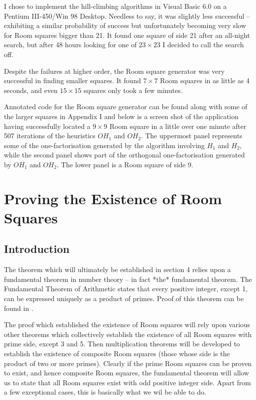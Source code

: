 \documentclass[11pt, a4paper]{book}\usepackage[]{graphicx}\usepackage[]{xcolor}
\begin{document}
I chose to implement the hill-climbing algorithms in Visual Basic
6.0 on a Pentium III-450/Win 98 Desktop. Needless to say, it was
slightly less successful – exhibiting a similar probability of
success but unfortunately becoming very slow for Room squares
bigger than 21. It found one square of side 21 after an all-night
search, but after 48 hours looking for one of
$23 \times 23$
I decided to
call the search off.

Despite the failures at higher order, the Room square generator
was very successful in finding smaller squares. It found
$7 \times 7$
Room squares in as little as 4 seconds, and even
$15 \times 15$
squares only took a few minutes.

Annotated code for the Room square generator can be found along
with some of the larger squares in Appendix I and below is a
screen shot of the application having successfully located a 
$9 \times 9$
Room square in a little over one minute after 507 iterations of
the heuristics $OH_1$ and $OH_2$. The uppermost panel represents
some of the one-factorisation generated by the algorithm involving
$H_1$ and $H_2$, while the second panel shows part of the
orthogonal one-factorisation generated by $OH_1$ and $OH_2$. The
lower panel is a Room square of side 9.


\chapter{Proving the Existence of Room Squares}

\section{Introduction}

The theorem which will ultimately be established in section
4 relies upon a fundamental theorem in number theory – in
fact *the* fundamental theorem. The Fundamental Theorem of
Arithmetic states that every positive integer, except 1, can
be expressed uniquely as a product of primes. Proof of this
theorem can be found in
\cite{hardyIntroductionTheoryNumbers1979}.

The proof which established the existence of Room squares
will rely upon various other theorems which collectively
establish the existence of all Room squares with prime side,
except 3 and 5. Then multiplication theorems will be
developed to establish the existence of composite Room
squares (those whose side is the product of two or more
primes). Clearly if the prime Room squares can be proven to
exist, and hence composite Room squares, the fundamental
theorem will allow us to state that all Room squares exist
with odd positive integer side. Apart from a few exceptional
cases, this is basically what we wil be able to do.
\end{document}
